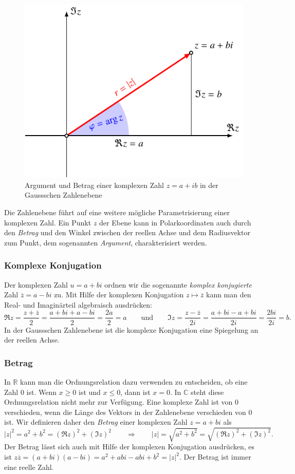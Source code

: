 \begin{figure}
\centering
\includegraphics{chapters/05-zahlen/images/komplex.pdf}
\caption{Argument und Betrag einer komplexen Zahl $z=a+ib$ in der 
Gaussschen Zahlen\-ebene
\label{buch:zahlen:cfig}}
\end{figure}%

Die Zahlenebene führt auf eine weitere mögliche Parametrisierung einer
komplexen Zahl.
Ein Punkt $z$ der Ebene kann in Polarkoordinaten auch durch den {\em Betrag}
%
%
und den Winkel zwischen der reellen Achse und dem Radiusvektor zum Punkt,
dem sogenannten {\em Argument},
charakterisiert werden.

\subsubsection{Komplexe Konjugation}
Der komplexen Zahl $u=a+bi$ ordnen wir die sogenannte
{\em komplex konjugierte} Zahl $\overline{z} = a-bi$ zu.
Mit Hilfe der komplexen Konjugation $z\mapsto\overline{z}$
kann man den Real- und Imaginärteil
%
%
algebraisch ausdrücken:
\[
\Re z 
=
\frac{z+\overline{z}}2
=
\frac{a+bi+a-bi}{2}
=
\frac{2a}2
=a
\qquad\text{und}\qquad
\Im z
=
\frac{z-\overline{z}}{2i}
=
\frac{a+bi-a+bi}{2i}
=
\frac{2bi}{2i}
=
b.
\]
In der Gaussschen Zahlenebene ist die komplexe Konjugation eine
Spiegelung an der reellen Achse.

\subsubsection{Betrag}
In $\mathbb{R}$ kann man die Ordnungsrelation dazu verwenden zu entscheiden,
ob eine Zahl $0$ ist. 
Wenn $x\ge 0$ ist und $x\le 0$, dann ist $x=0$.
In $\mathbb{C}$ steht diese Ordnungsrelation nicht mehr zur Verfügung.
Eine komplexe Zahl ist von $0$ verschieden, wenn die Länge des Vektors in der
Zahlenebene verschieden von $0$ ist.
Wir definieren daher den {\em Betrag} einer komplexen Zahl $z=a+bi$ als
\[
|z|^2
=
a^2 +b^2
=
(\Re z)^2 + (\Im z)^2
\qquad\Rightarrow\qquad
|z|
=
\sqrt{a^2+b^2}
=
\sqrt{(\Re z)^2 + (\Im z)^2}.
\]
Der Betrag lässt sich auch mit Hilfe der komplexen Konjugation ausdrücken,
es ist $z\overline{z} = (a+bi)(a-bi) = a^2+abi-abi+b^2 = |z|^2$.
Der Betrag ist immer eine reelle Zahl.

